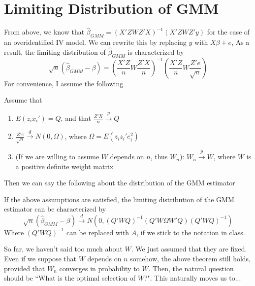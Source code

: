\section{Limiting Distribution of GMM}
From above, we know that $\hat{\beta}_{GMM}=(X'ZWZ'X)^{-1}(X'ZWZ'y)$ for the case of an overidentified IV model. We can rewrite this by replacing $y$ with $X\beta+e$, As a result, the limiting distribution of $\hat{\beta}_{GMM}$ is characterized by
\[
\sqrt{n}(\hat{\beta}_{GMM}-\beta)=\left(\frac{X'Z}{n}W\frac{Z'X}{n}\right)^{-1}\left(\frac{X'Z}{n}W\frac{Z'e}{\sqrt{n}}\right)
\]
For convenience, I assume the following
\begin{mdframed}[backgroundcolor=blue!5] 
\begin{assumption}
Assume that
\begin{enumerate}
\item $E(z_ix_i')=Q$, and that $\frac{Z'X}{n}\xrightarrow{p}Q$
\item $\frac{Z'e}{\sqrt{n}}\xrightarrow{d}N(0,\Omega)$, where $\Omega = E(z_iz_i'e_i^2)$
\item (If we are willing to assume $W$ depends on $n$, thus $W_n$): $W_n\xrightarrow{p}W$, where $W$ is a positive definite weight matrix
\end{enumerate}
\end{assumption}
\end{mdframed}
Then we can say the following about the distribution of the GMM estimator
\begin{mdframed}[backgroundcolor=green!5] 
\begin{theorem} If the above assumptions are satisfied, the limiting distribution of the GMM estimator can be characterized by
\[
\sqrt{n}(\hat{\beta}_{GMM}-\beta)\xrightarrow{d}N(0,(Q'WQ)^{-1}(Q'W\Omega W'Q)(Q'WQ)^{-1})
\]
Where $(Q'WQ)^{-1}$ can be replaced with $A$, if we stick to the notation in class. 
\end{theorem}
\end{mdframed}\par
So far, we haven't said too much about $W$. We just assumed that they are fixed. Even if we suppose that $W$ depends on $n$ somehow, the above theorem still holds, provided that $W_n$ converges in probability to $W$. Then, the natural question should be ``What is the optimal selection of $W$?". This naturally moves us to...
